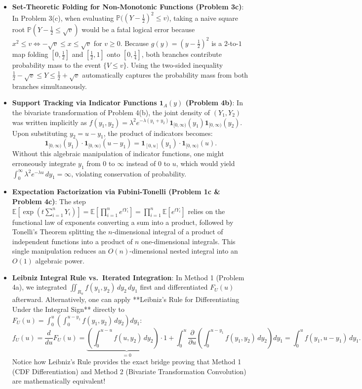 \documentclass[11pt, letterpaper]{article}
\theoremstyle{definition}
\theoremstyle{remark}
\newcommand{\E}{\mathbb{E}}
\newcommand{\Prob}{\mathbb{P}}
\begin{document}
\begin{itemize}
    \item \textbf{Set-Theoretic Folding for Non-Monotonic Functions (Problem 3c)}:
    In Problem 3(c), when evaluating $\Prob\big((Y - \frac{1}{2})^2 \le v\big)$, taking a naive square root $\Prob(Y - \frac{1}{2} \le \sqrt{v})$ would be a fatal logical error because $x^2 \le v \iff -\sqrt{v} \le x \le \sqrt{v}$ for $v \ge 0$. Because $g(y) = (y - \frac{1}{2})^2$ is a $2$-to-$1$ map folding $[0, \frac{1}{2}]$ and $[\frac{1}{2}, 1]$ onto $[0, \frac{1}{4}]$, both branches contribute probability mass to the event $\{V \le v\}$. Using the two-sided inequality $\frac{1}{2} - \sqrt{v} \le Y \le \frac{1}{2} + \sqrt{v}$ automatically captures the probability mass from both branches simultaneously.

    \item \textbf{Support Tracking via Indicator Functions $\mathbf{1}_A(y)$ (Problem 4b)}:
    In the bivariate transformation of Problem 4(b), the joint density of $(Y_1, Y_2)$ was written implicitly as $f(y_1, y_2) = \lambda^2 e^{-\lambda(y_1 + y_2)} \mathbf{1}_{[0, \infty)}(y_1) \mathbf{1}_{[0, \infty)}(y_2)$. Upon substituting $y_2 = u - y_1$, the product of indicators becomes:
    \[
        \mathbf{1}_{[0, \infty)}(y_1) \cdot \mathbf{1}_{[0, \infty)}(u - y_1) = \mathbf{1}_{[0, u]}(y_1) \cdot \mathbf{1}_{[0, \infty)}(u).
    \]
    Without this algebraic manipulation of indicator functions, one might erroneously integrate $y_1$ from $0$ to $\infty$ instead of $0$ to $u$, which would yield $\int_0^\infty \lambda^2 e^{-\lambda u} \, dy_1 = \infty$, violating conservation of probability.

    \item \textbf{Expectation Factorization via Fubini-Tonelli (Problem 1c \& Problem 4c)}:
    The step $\E\left[\exp\left(t\sum_{i=1}^n Y_i\right)\right] = \E\left[\prod_{i=1}^n e^{tY_i}\right] = \prod_{i=1}^n \E[e^{tY_i}]$ relies on the functional law of exponents converting a sum into a product, followed by Tonelli's Theorem splitting the $n$-dimensional integral of a product of independent functions into a product of $n$ one-dimensional integrals. This single manipulation reduces an $O(n)$-dimensional nested integral into an $O(1)$ algebraic power.

    \item \textbf{Leibniz Integral Rule vs.\ Iterated Integration}:
    In Method 1 (Problem 4a), we integrated $\iint_{R_u} f(y_1, y_2) \, dy_2 \, dy_1$ first and differentiated $F_U(u)$ afterward. Alternatively, one can apply **Leibniz's Rule for Differentiating Under the Integral Sign** directly to $F_U(u) = \int_0^u \left(\int_0^{u - y_1} f(y_1, y_2) \, dy_2\right) dy_1$:
    \[
        f_U(u) = \frac{d}{du} F_U(u) = \underbrace{\left(\int_0^{u - u} f(u, y_2) \, dy_2\right) \cdot 1}_{= 0} + \int_0^u \frac{\partial}{\partial u}\left(\int_0^{u - y_1} f(y_1, y_2) \, dy_2\right) dy_1 = \int_0^u f(y_1, u - y_1) \, dy_1.
    \]
    Notice how Leibniz's Rule provides the exact bridge proving that Method 1 (CDF Differentiation) and Method 2 (Bivariate Transformation Convolution) are mathematically equivalent!
\end{itemize}
\end{document}
